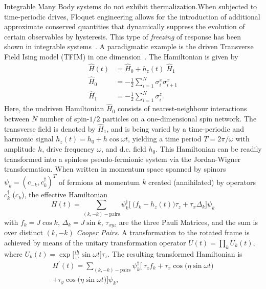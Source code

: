 \documentclass[%
reprint,
superscriptaddress,
amsmath,amssymb,
aps,
prb,
showkeys,
]{revtex4-2}
\begin{document}
Integrable Many Body systems do not exhibit thermalization.When subjected to time-periodic drives, Floquet engineering allows for the introduction of additional approximate conserved quantities that dynamically suppress the evolution of certain observables by hysteresis. This type of \textit{freezing} of response
has been shown in integrable systems~\cite{roy_fate_2015}.
A paradigmatic example is  the driven Transverse Field Ising model (TFIM) in one dimension~\cite{stinchcombe_ising_1973}. The Hamiltonian is given by
	\begin{align}
		\label{eq:tfim:hamilt}
		\hat{H}(t) &= \hat{H}_0 + h_z(t) \; \hat{H}_1\\
		\hat{H}_0 &= -\frac{1}{2}\sum^N_{i=1} \sigma^x_i \sigma^x_{i+1}\\
		\hat{H}_1 &= -\frac{1}{2}\sum_{i=1}^N \sigma^z_{i}.
	\end{align}
Here, the undriven Hamiltonian $\hat{H}_0$ consists of nearest-neighbour interactions between $N$ number of  spin-$1/2$ particles on a one-dimensional spin network. The transverse field is denoted by $\hat{H}_1$, and is being varied by a time-periodic and harmonic signal $h_z(t) = h_0 + h\cos{\omega t}$, yielding a time period $T=2\pi/\omega$ with amplitude $h$, drive frequency $\omega$, and d.c. field $h_0$. This Hamiltonian can be readily transformed into a spinless pseudo-fermionic system via the Jordan-Wigner transformation. When written in momentum space spanned by spinors $\psi_k = (c_{-k}, c^\dagger_k)^T$ of fermions at momentum $k$ created (annihilated) by operators $c^\dagger_k$ ($c_k$), the effective Hamiltonian ~\cite{mbeng_quantum_2020}
	\begin{equation}
		H(t) = \sum_{(k,-k)-\mbox{pairs}} \psi^\dagger_k
		\Bigg[\ \bigg(f_k - h_z(t)\bigg)\tau_z +  \tau_x \Delta_k\Bigg]\psi_k
	\end{equation}
	with $f_k = J\cos{k}$, $\Delta_k = J\sin{k}$, $\tau_{xyz}$ are the three Pauli Matrices, and the sum is over distinct $(k, -k)$ \textit{Cooper Pairs}. A transformation to the rotated frame is achieved by means of the unitary transformation operator $U(t) = \prod_k U_k(t)$, where $U_k(t) = \exp{\Big[\frac{i h}{\omega}\sin{\omega t}\Big]\tau_z}$. The resulting transformed Hamiltonian is 
	\begin{multline*}
		H^\prime(t) = \sum_{(k,-k)-\mbox{pairs}} \psi^\dagger_k
		\bigg[\ \tau_z f_k + \tau_x \cos{\big(\eta\sin{\omega t}\big)}  \\
		+ \tau_y \cos{\big(\eta\sin{\omega t}\big)}\bigg]\psi_k,
	\end{multline*}
\end{document}
